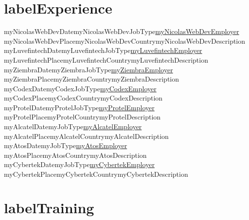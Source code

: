 \documentclass[11pt,a4paper]{moderncv}
\begin{document}
\section{labelExperience}
\cventry%
    {myNicolasWebDevDate}{myNicolasWebDevJobType}{\href{myNicolasWebDevWebsite}{myNicolasWebDevEmployer}}
    {myNicolasWebDevPlace}{myNicolasWebDevCountry}{myNicolasWebDevDescription}
\cventry%
    {myLuvefintechDate}{myLuvefintechJobType}{\href{myLuvefintechWebsite}{myLuvefintechEmployer}}
    {myLuvefintechPlace}{myLuvefintechCountry}{myLuvefintechDescription}
\cventry%
    {myZiembraDate}{myZiembraJobType}{\href{myZiembraWebsite}{myZiembraEmployer}}
    {myZiembraPlace}{myZiembraCountry}{myZiembraDescription}
\cventry%
    {myCodexDate}{myCodexJobType}{\href{myCodexWebsite}{myCodexEmployer}}
    {myCodexPlace}{myCodexCountry}{myCodexDescription}
\cventry%
    {myProtelDate}{myProtelJobType}{\href{myProtelWebsite}{myProtelEmployer}}
    {myProtelPlace}{myProtelCountry}{myProtelDescription}
\cventry%
    {myAlcatelDate}{myJobType}{\href{myAlcatelWebsite}{myAlcatelEmployer}}
    {myAlcatelPlace}{myAlcatelCountry}{myAlcatelDescription}
\cventry%
    {myAtosDate}{myJobType}{\href{myAtosWebsite}{myAtosEmployer}}
    {myAtosPlace}{myAtosCountry}{myAtosDescription}
\cventry%
    {myCybertekDate}{myJobType}{\href{myCybertekWebsite}{myCybertekEmployer}}
    {myCybertekPlace}{myCybertekCountry}{myCybertekDescription}

\newcommand\bookentry[3]{
    \cventry{}{#1}{#2}{#3}{}{}
}

\section{labelTraining}
\end{document}
